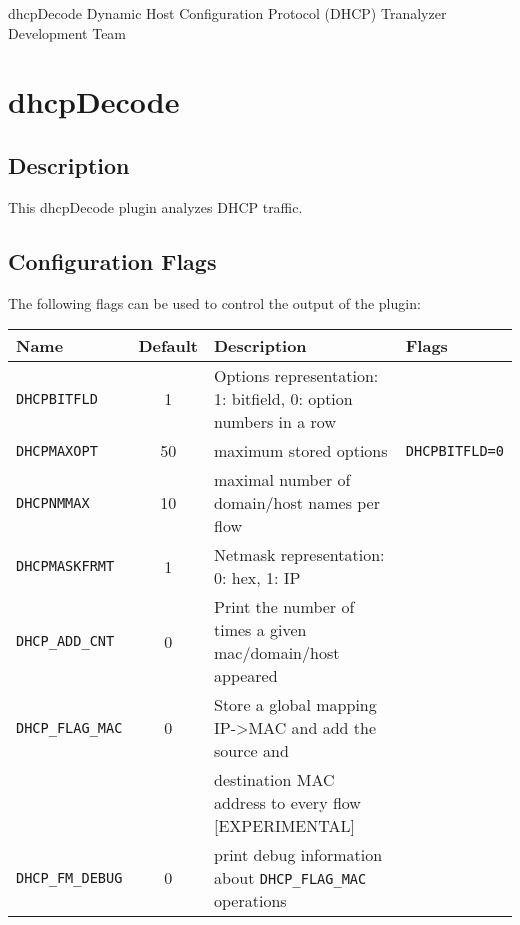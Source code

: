 \documentclass[documentation]{subfiles}
\begin{document}
\trantitle
    {dhcpDecode}
    {Dynamic Host Configuration Protocol (DHCP)}
    {Tranalyzer Development Team}

\section{dhcpDecode}\label{s:dhcpDecode}

\subsection{Description}
This dhcpDecode plugin analyzes DHCP traffic.


\subsection{Configuration Flags}
The following flags can be used to control the output of the plugin:
\begin{longtable}{lcll}
    \toprule
    {\bf Name} & {\bf Default} & {\bf Description} & {\bf Flags}\\
    \midrule\endhead%
    {\tt DHCPBITFLD}      &  1 & Options representation: 1: bitfield, 0: option numbers in a row \\
    {\tt DHCPMAXOPT}      & 50 & maximum stored options & {\tt DHCPBITFLD=0}\\
    {\tt DHCPNMMAX}       & 10 & maximal number of domain/host names per flow \\
    {\tt DHCPMASKFRMT}    &  1 & Netmask representation: 0: hex, 1: IP\\
    {\tt DHCP\_ADD\_CNT}  &  0 & Print the number of times a given mac/domain/host appeared\\
    {\tt DHCP\_FLAG\_MAC} &  0 & Store a global mapping IP->MAC and add the source and\\
                          &    & destination MAC address to every flow [EXPERIMENTAL]\\
    {\tt DHCP\_FM\_DEBUG} &  0 & print debug information about {\tt DHCP\_FLAG\_MAC} operations\\
    \bottomrule
\end{longtable}
\end{document}
